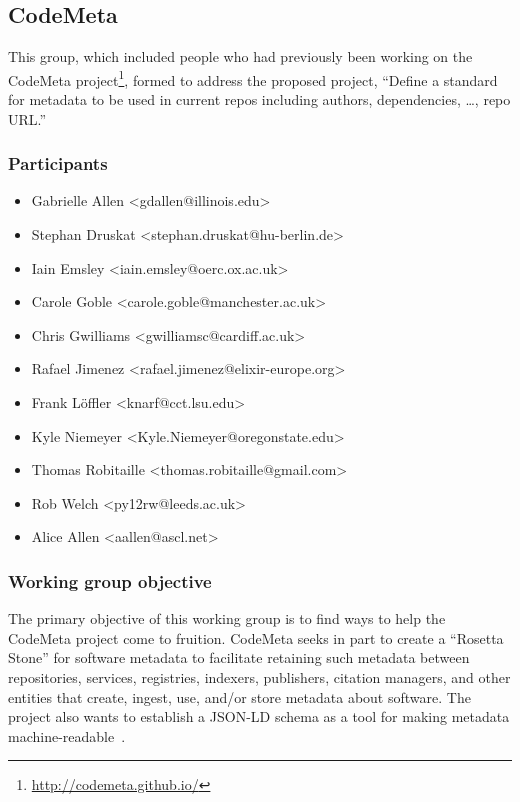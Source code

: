 \subsection{CodeMeta}
\label{sec:CodeMeta}


This group, which included people who had previously been working on the CodeMeta project\footnote{\url{http://codemeta.github.io/}}, formed to address the proposed project,
 ``Define a standard for metadata to be used in current repos including authors, dependencies, \dots{}, repo URL.''

\subsubsection{Participants}

\begin{itemize}
\item Gabrielle Allen <gdallen@illinois.edu>
\item Stephan Druskat <stephan.druskat@hu-berlin.de>
\item Iain Emsley <iain.emsley@oerc.ox.ac.uk>
\item Carole Goble <carole.goble@manchester.ac.uk>
\item Chris Gwilliams <gwilliamsc@cardiff.ac.uk>
\item Rafael Jimenez <rafael.jimenez@elixir-europe.org>
\item Frank L\"{o}ffler <knarf@cct.lsu.edu>
\item Kyle Niemeyer <Kyle.Niemeyer@oregonstate.edu>
\item Thomas Robitaille <thomas.robitaille@gmail.com>
\item Rob Welch <py12rw@leeds.ac.uk>
\item Alice Allen <aallen@ascl.net>
\end{itemize}

\subsubsection{Working group objective}

The primary objective of this working group is to find ways to help the CodeMeta project come to fruition. CodeMeta seeks in part to create a ``Rosetta Stone'' for software metadata to facilitate retaining such metadata between repositories, services, registries, indexers, publishers, citation managers, and other entities that create, ingest, use, and/or store metadata about software. The project also wants to establish a JSON-LD schema as a tool for making metadata machine-readable~\cite{CodeMeta_schema}.

